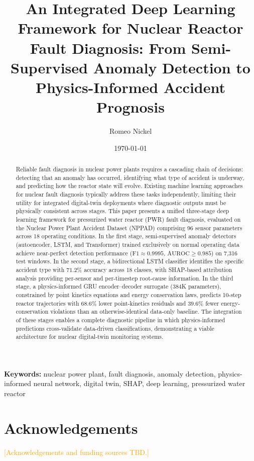 \documentclass[11pt,a4paper]{article}
\title{\textbf{An Integrated Deep Learning Framework for Nuclear Reactor Fault Diagnosis: From Semi-Supervised Anomaly Detection to Physics-Informed Accident Prognosis}}
\author[1]{Romeo Nickel}
\affil[1]{\textit{Affiliation TBD}}
\date{\today}
\newcommand{\nppad}{NPPAD\xspace}
\newcommand{\placeholder}[1]{\textcolor{orange}{[#1]}}
\begin{document}
\maketitle

\begin{abstract}
Reliable fault diagnosis in nuclear power plants requires a cascading chain of decisions: detecting that an anomaly has occurred, identifying what type of accident is underway, and predicting how the reactor state will evolve. Existing machine learning approaches for nuclear fault diagnosis typically address these tasks independently, limiting their utility for integrated digital-twin deployments where diagnostic outputs must be physically consistent across stages. This paper presents a unified three-stage deep learning framework for pressurized water reactor (PWR) fault diagnosis, evaluated on the Nuclear Power Plant Accident Dataset (\nppad) comprising 96 sensor parameters across 18 operating conditions. In the first stage, semi-supervised anomaly detectors (autoencoder, LSTM, and Transformer) trained exclusively on normal operating data achieve near-perfect detection performance ($\mathrm{F1} \approx 0.9995$, $\mathrm{AUROC} \geq 0.985$) on 7{,}316 test windows. In the second stage, a bidirectional LSTM classifier identifies the specific accident type with $71.2\%$ accuracy across 18 classes, with SHAP-based attribution analysis providing per-sensor and per-timestep root-cause information. In the third stage, a physics-informed GRU encoder--decoder surrogate ($384$K parameters), constrained by point kinetics equations and energy conservation laws, predicts 10-step reactor trajectories with $68.6\%$ lower point-kinetics residuals and $39.6\%$ fewer energy-conservation violations than an otherwise-identical data-only baseline. The integration of these stages enables a complete diagnostic pipeline in which physics-informed predictions cross-validate data-driven classifications, demonstrating a viable architecture for nuclear digital-twin monitoring systems.
\end{abstract}

\noindent\textbf{Keywords:} nuclear power plant, fault diagnosis, anomaly detection, physics-informed neural network, digital twin, SHAP, deep learning, pressurized water reactor









\section*{Acknowledgements}
\placeholder{Acknowledgements and funding sources TBD.}



\end{document}
